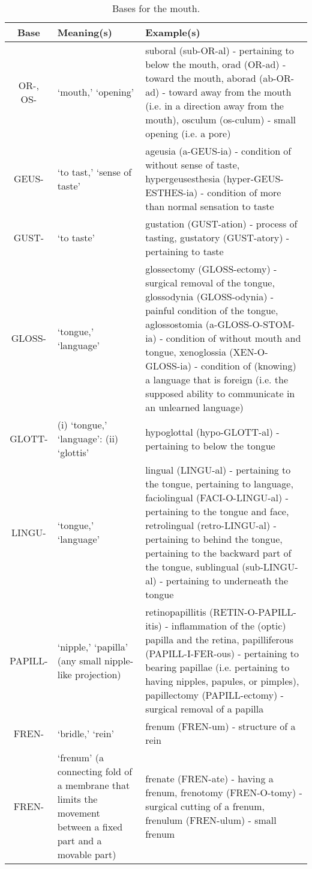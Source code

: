 \begin{longtable}{c | p{} | p{}}
    \caption{Bases for the mouth.}
    \hline
    Base & Meaning(s) & Example(s) \\ \hline
        OR-, OS- & `mouth,' `opening' & suboral (sub-OR-al) - pertaining to below the mouth, orad (OR-ad) - toward the mouth, aborad (ab-OR-ad) - toward away from the mouth (i.e. in a direction away from the mouth), osculum (os-culum) - small opening (i.e. a pore) \\
        GEUS- & `to tast,' `sense of taste' & ageusia (a-GEUS-ia) - condition of without sense of taste, hypergeusesthesia (hyper-GEUS-ESTHES-ia) - condition of more than normal sensation to taste \\
        GUST- & `to taste' & gustation (GUST-ation) - process of tasting, gustatory (GUST-atory) - pertaining to taste \\
        GLOSS- & `tongue,' `language' & glossectomy (GLOSS-ectomy) - surgical removal of the tongue, glossodynia (GLOSS-odynia) - painful condition of the tongue, aglossostomia (a-GLOSS-O-STOM-ia) - condition of without mouth and tongue, xenoglossia (XEN-O-GLOSS-ia) - condition of (knowing) a language that is foreign (i.e. the supposed ability to communicate in an unlearned language) \\
        GLOTT- & (i) `tongue,' `language': (ii) `glottis' & hypoglottal (hypo-GLOTT-al) - pertaining to below the tongue \\
        LINGU- & `tongue,' `language' & lingual (LINGU-al) - pertaining to the tongue, pertaining to language, faciolingual (FACI-O-LINGU-al) - pertaining to the tongue and face, retrolingual (retro-LINGU-al) - pertaining to behind the tongue, pertaining to the backward part of the tongue, sublingual (sub-LINGU-al) - pertaining to underneath the tongue \\ 
        PAPILL- & `nipple,' `papilla' (any small nipple-like projection) & retinopapillitis (RETIN-O-PAPILL-itis) - inflammation of the (optic) papilla and the retina, papilliferous (PAPILL-I-FER-ous) - pertaining to bearing papillae (i.e. pertaining to having nipples, papules, or pimples), papillectomy (PAPILL-ectomy) - surgical removal of a papilla \\
        FREN- & `bridle,' `rein' & frenum (FREN-um) - structure of a rein \\
        FREN- & `frenum' (a connecting fold of a membrane that limits the movement between a fixed part and a movable part) & frenate (FREN-ate) - having a frenum, frenotomy (FREN-O-tomy) - surgical cutting of a frenum, frenulum (FREN-ulum) - small frenum \\

\end{longtable}
